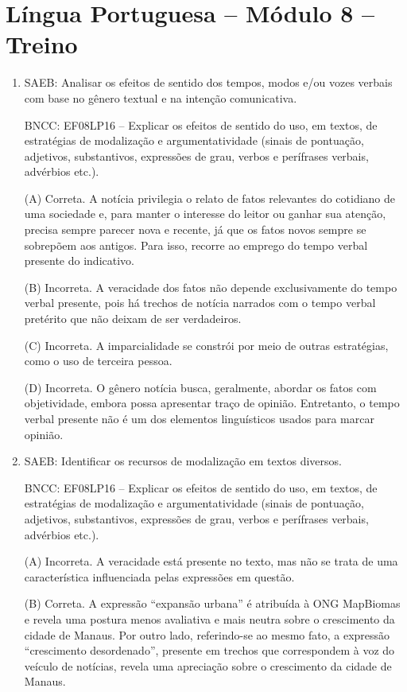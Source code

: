 \section*{Língua Portuguesa – Módulo 8 – Treino}

\begin{enumerate}
	\item
SAEB: Analisar os efeitos de sentido dos tempos, modos e/ou vozes
verbais com base no gênero textual e na intenção comunicativa. 

BNCC: EF08LP16 -- Explicar os efeitos de sentido do uso, em textos, de
estratégias de modalização e argumentatividade (sinais de pontuação,
adjetivos, substantivos, expressões de grau, verbos e perífrases
verbais, advérbios etc.).

(A) Correta. A notícia privilegia o relato de fatos relevantes do
cotidiano de uma sociedade e, para manter o interesse do leitor ou
ganhar sua atenção, precisa sempre parecer nova e recente, já que os
fatos novos sempre se sobrepõem aos antigos. Para isso, recorre ao
emprego do tempo verbal presente do indicativo. 

(B) Incorreta. A
veracidade dos fatos não depende exclusivamente do tempo verbal
presente, pois há trechos de notícia narrados com o tempo verbal
pretérito que não deixam de ser verdadeiros. 

(C) Incorreta. A
imparcialidade se constrói por meio de outras estratégias, como o uso de
terceira pessoa. 

(D) Incorreta. O gênero notícia busca, geralmente,
abordar os fatos com objetividade, embora possa apresentar traço de
opinião. Entretanto, o tempo verbal presente não é um dos elementos
linguísticos usados para marcar opinião.

\item
SAEB: Identificar os recursos de modalização em textos diversos. 

BNCC: EF08LP16 -- Explicar os efeitos de sentido do uso, em textos, de
estratégias de modalização e argumentatividade (sinais de pontuação,
adjetivos, substantivos, expressões de grau, verbos e perífrases
verbais, advérbios etc.).

(A) Incorreta. A veracidade está presente no texto, mas não se trata de
uma característica influenciada pelas expressões em questão. 

(B)
Correta. A expressão ``expansão urbana'' é atribuída à ONG MapBiomas e
revela uma postura menos avaliativa e mais neutra sobre o crescimento da
cidade de Manaus. Por outro lado, referindo-se ao mesmo fato, a
expressão ``crescimento desordenado'', presente em trechos que
correspondem à voz do veículo de notícias, revela uma apreciação sobre o
crescimento da cidade de Manaus. 


\end{enumerate}
